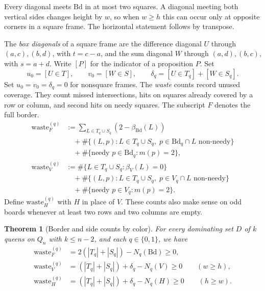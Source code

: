 \documentclass[11pt,a4paper]{article}
\theoremstyle{result}
\newtheorem{theorem}{Theorem}[section]
\theoremstyle{definition}
\theoremstyle{remark}
\newcommand{\waste}{\mathrm{waste}}
\newcommand{\Bd}{\mathrm{Bd}}
\begin{document}
Every diagonal meets $\Bd$ in at most two squares. A diagonal
meeting both vertical sides changes height by $w$, so when $w\ge h$
this can occur only at opposite corners in a square frame. The
horizontal statement follows by transpose.

The \emph{box diagonals} of a square frame are the difference
diagonal $U$ through $(a,c),(b,d)$, with $t=c-a$, and the sum
diagonal $W$ through $(a,d),(b,c)$, with $s=a+d$.
Write $[P]$ for the indicator of a proposition $P$. Set
\[
  u_0=[U\in T],\qquad v_0=[W\in S],\qquad
  \delta_q=[U\in T_q]+[W\in S_q].
\]
Set $u_0=v_0=\delta_q=0$ for nonsquare frames. The \emph{waste}
counts record unused coverage. They count missed intersections,
hits on squares already covered by a row or column, and second
hits on needy squares. The subscript $F$ denotes the full border.
\begin{align*}
  \waste_F^{(q)} &:= \sum_{L \in T_q \cup S_q} (2 - \beta_{\Bd}(L))\\
    &\quad + \#\{(L,p) : L \in T_q \cup S_q,\; p \in \Bd_q \cap L \text{ non-needy}\}\\
    &\quad + \#\{\text{needy } p \in \Bd_q : m(p)=2\}, \\
  \waste_V^{(q)} &:= \#\{L \in T_q \cup S_q : \beta_V(L)=0\}\\
    &\quad + \#\{(L,p) : L \in T_q \cup S_q,\; p \in V_q \cap L \text{ non-needy}\}\\
    &\quad + \#\{\text{needy } p \in V_q : m(p)=2\}.
\end{align*}
Define $\waste_H^{(q)}$ with $H$ in place of $V$. These counts
also make sense on odd boards whenever at least two rows and two
columns are empty.

\begin{theorem}[Border and side counts by color]\label{thm:colorsplit}
For every dominating set $D$ of $k$ queens on $Q_n$ with $k\le n-2$,
and each $q\in\{0,1\}$, we have
\begin{align}
  \waste_F^{(q)} &= 2(|T_q| + |S_q|) - N_q(\Bd) \ge 0, \label{eq:Fq} \\
  \waste_V^{(q)} &= (|T_q| + |S_q|) + \delta_q - N_q(V) \ge 0 \qquad (w \ge h), \label{eq:Vq} \\
  \waste_H^{(q)} &= (|T_q| + |S_q|) + \delta_q - N_q(H) \ge 0 \qquad (h \ge w). \label{eq:Hq}
\end{align}
\end{theorem}
\end{document}

